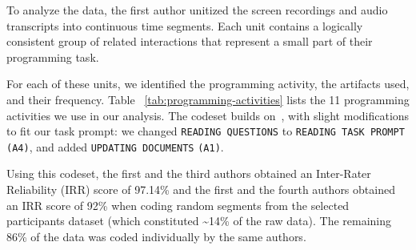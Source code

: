 

To analyze the data, the first author unitized the screen recordings and audio transcripts into continuous time segments. Each unit contains a logically consistent group of related interactions that represent a small part of their programming task. %

For each of these units, we identified the programming activity, the artifacts used, and their frequency. Table ~\ref{tab:programming-activities} lists  the 11 programming activities we use in our analysis. The codeset builds on~\cite{Wang:2017}, with slight modifications to fit our task prompt: we changed \texttt{READING QUESTIONS} to \texttt{READING TASK PROMPT} \texttt{(A4)}, and added \texttt{UPDATING DOCUMENTS} \texttt{(A1)}.

Using this codeset, the first and the third authors obtained an Inter-Rater Reliability (IRR) score of 97.14\% and the first and the fourth authors obtained an IRR score of 92\% when coding random segments from the selected participants dataset (which constituted \textasciitilde14\% of the raw data). The remaining 86\% of the data was coded individually by the same authors.




